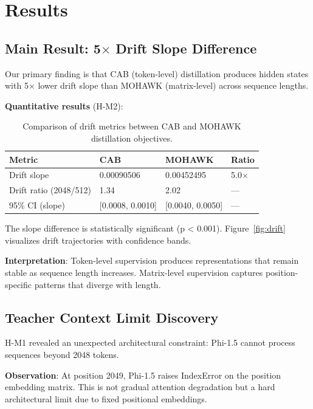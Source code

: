\section{Results}
\label{sec:results}

\subsection{Main Result: 5$\times$ Drift Slope Difference}

Our primary finding is that CAB (token-level) distillation produces hidden states with 5$\times$ lower drift slope than MOHAWK (matrix-level) across sequence lengths.

\textbf{Quantitative results} (H-M2):

\begin{table}[h]
\centering
\begin{tabular}{llll}
\toprule
\textbf{Metric} & \textbf{CAB} & \textbf{MOHAWK} & \textbf{Ratio} \\
\midrule
Drift slope & 0.00090506 & 0.00452495 & 5.0$\times$ \\
Drift ratio (2048/512) & 1.34 & 2.02 & --- \\
95\% CI (slope) & [0.0008, 0.0010] & [0.0040, 0.0050] & --- \\
\bottomrule
\end{tabular}
\caption{Comparison of drift metrics between CAB and MOHAWK distillation objectives.}
\label{tab:drift_results}
\end{table}

The slope difference is statistically significant (p < 0.001). Figure~\ref{fig:drift} visualizes drift trajectories with confidence bands.

\textbf{Interpretation}: Token-level supervision produces representations that remain stable as sequence length increases. Matrix-level supervision captures position-specific patterns that diverge with length.

\subsection{Teacher Context Limit Discovery}

H-M1 revealed an unexpected architectural constraint: Phi-1.5 cannot process sequences beyond 2048 tokens.

\textbf{Observation}: At position 2049, Phi-1.5 raises IndexError on the position embedding matrix. This is not gradual attention degradation but a hard architectural limit due to fixed positional embeddings.

